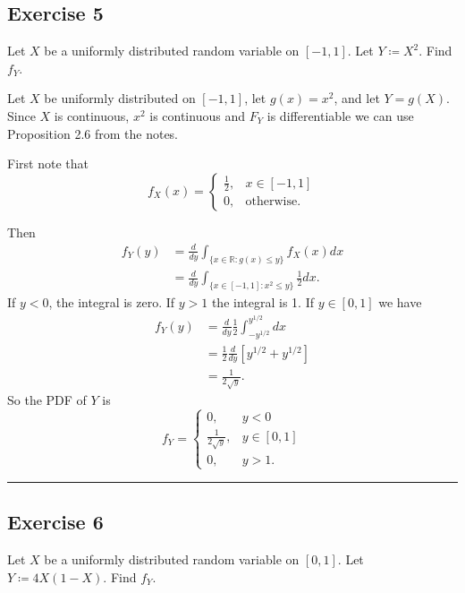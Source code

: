\documentclass{article}
\theoremstyle{break}
\newenvironment{solution}{{\bf Solution:}}{\hfill\rule{2mm}{2mm}}
\newcommand{\R}{\mathbb{R}}
\begin{document}
\subsection*{Exercise 5}
Let $X$ be a uniformly distributed random variable on $[-1,1]$. Let $Y \coloneqq X^2$. Find $f_Y$. 

\begin{solution}
Let $X$ be uniformly distributed on $[-1,1]$, let $g(x) = x^2$, and let $Y = g(X)$. Since $X$ is continuous, $x^2$ is continuous and $F_Y$ is differentiable we can use Proposition 2.6 from the notes. 

First note that
\[ f_X(x) = \begin{cases}
\frac{1}{2}, & x \in [-1,1] \\
0, & \text{otherwise}.
\end{cases}
\]

Then
\begin{align*}
f_Y(y) &= \frac{d}{dy} \int_{\{x \in \R : g(x) \leq y\}} f_X(x)dx \\
&= \frac{d}{dy} \int_{\{x \in [-1,1]: x^2 \leq y \}} \frac{1}{2} dx.
\end{align*}
If $y < 0$, the integral is zero. If $y > 1$ the integral is 1. If $y \in [0,1]$ we have 
\begin{align*}
f_Y(y) &= \frac{d}{dy} \frac{1}{2} \int_{-y^{1/2}}^{y^{1/2}} dx \\
&= \frac{1}{2} \frac{d}{dy} [y^{1/2} + y^{1/2}] \\
&= \frac{1}{2 \sqrt{y}}. 
\end{align*}
So the PDF of $Y$ is 
\[ f_Y = \begin{cases}
0, & y < 0 \\
\frac{1}{2 \sqrt{y}}, & y \in [0,1] \\
0, & y > 1.
\end{cases}
\]
\end{solution}

\subsection*{Exercise 6}
Let $X$ be a uniformly distributed random variable on $[0,1]$. Let $Y \coloneqq 4X(1-X)$. Find $f_Y$.
\end{document}
